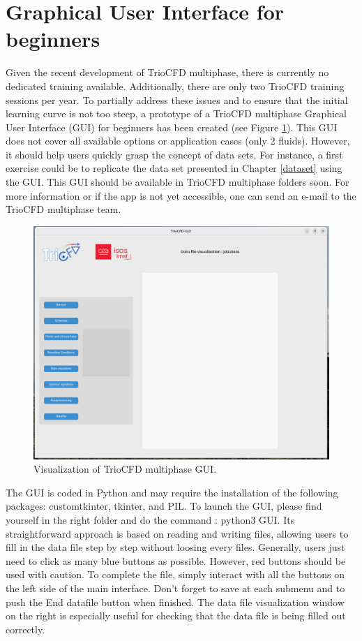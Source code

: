 \section{Graphical User Interface for beginners}\label{archi:GUI}
Given the recent development of TrioCFD multiphase, there is currently no dedicated training available. Additionally, there are only two TrioCFD training sessions per year. To partially address these issues and to ensure that the initial learning curve is not too steep, a prototype of a TrioCFD multiphase Graphical User Interface (GUI) for beginners has been created (see Figure \ref{GUI}). This GUI does not cover all available options or application cases (only 2 fluids). However, it should help users quickly grasp the concept of data sets. For instance, a first exercise could be to replicate the data set presented in Chapter \ref{dataset} using the GUI. This GUI should be available in TrioCFD multiphase folders soon. For more information or if the app is not yet accessible, one can send an e-mail to the TrioCFD multiphase team.
\begin{figure}[!ht]
    \centering
    \includegraphics[scale=0.35]{Figure/GUI.png}
    \caption{Visualization of TrioCFD multiphase GUI.}
    \label{GUI}
\end{figure}
The GUI is coded in Python and may require the installation of the following packages: customtkinter, tkinter, and PIL. To launch the GUI, please find yourself in the right folder and do the command : python3 GUI. Its straightforward approach is based on reading and writing files, allowing users to fill in the data file step by step without loosing every files. Generally, users just need to click as many blue buttons as possible. However, red buttons should be used with caution. To complete the file, simply interact with all the buttons on the left side of the main interface. Don't forget to save at each submenu and to push the End datafile button when finished. The data file visualization window on the right is especially useful for checking that the data file is being filled out correctly.
